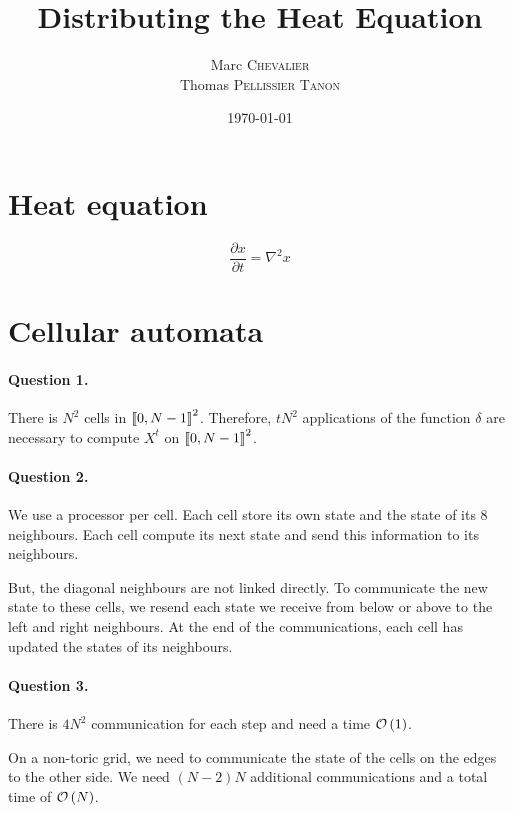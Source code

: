 

\author{
    Marc \textsc{Chevalier}\\
    Thomas \textsc{Pellissier Tanon}
}
\date{\today}
\title{Distributing the Heat Equation}


\maketitle

\section{Heat equation}

$$
    \frac{\partial x}{\partial t}=\nabla^2 x
$$

\section{Cellular automata}

\paragraph{Question 1.} There is $N^2$ cells in $\left\llbracket 0,N-1 \right\rrbracket^2$. Therefore, $tN^2$ applications of the function $\delta$ are necessary to compute $X^t$ on $\left\llbracket 0,N-1 \right\rrbracket^2$.

\paragraph{Question 2.} We use a processor per cell. Each cell store its own state and the state of its 8 neighbours. Each cell compute its next state and send this information to its neighbours.

But, the diagonal neighbours are not linked directly. To communicate the new state to these cells, we resend each state we receive from below or above to the left and right neighbours. At the end of the communications, each cell has updated the states of its neighbours.

\paragraph{Question 3.}
There is $4N^2$ communication for each step and need a time $\mathcal O \left( 1 \right)$. 

On a non-toric grid, we need to communicate the state of the cells on the edges to the other side. We need $(N-2)N$ additional communications and a total time of $\mathcal O \left( N \right)$.

